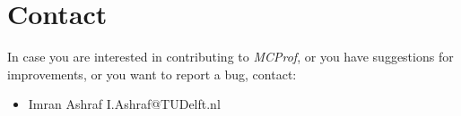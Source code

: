 \documentclass[10pt]{article}
\newcommand{\MCPROF}{\emph{MCProf}}
\begin{document}
\section{Contact}
\label{sec:contact}

In case you are interested in contributing to \MCPROF{}, or you have suggestions
for improvements, or you want to report a bug, contact:

\begin{itemize}
\item Imran Ashraf \textlangle I.Ashraf@TUDelft.nl \textrangle
\end{itemize}




\end{document}
